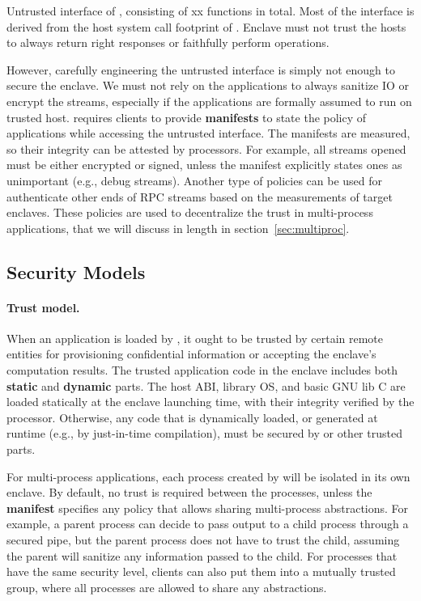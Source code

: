 \begin{table}
\centering

\caption{
Untrusted interface of \sysname{}, consisting of xx functions in total.
Most of the interface is derived from the host system call footprint of
\graphene{} \libos{}. Enclave must not trust the hosts to
always return right responses or faithfully perform operations.
}
\label{tab:interface}
\end{table}

However, carefully engineering the untrusted interface is simply not enough
to secure the enclave.
We must not rely on the applications to always
sanitize IO or encrypt the streams,
especially if the applications are formally assumed to run on trusted host.
\sysname{} requires clients to provide {\bf manifests} to state
the policy of applications while accessing the untrusted interface.
The manifests are measured, so their integrity can be attested by processors.
For example, all streams opened must be either encrypted or signed,
unless the manifest explicitly states ones as unimportant
(e.g., debug streams).
Another type of policies can be used for authenticate other ends of RPC streams
based on the measurements of target enclaves.
These policies are used to decentralize the trust in multi-process applications,
that we will discuss in length in section~\ref{sec:multiproc}.

\subsection{Security Models}
\label{sec:background:security}

\paragraph{Trust model.}
When an application is loaded by \sysname{}, it ought to be trusted by
certain remote entities
for provisioning confidential information or
accepting the enclave's computation results.
The trusted application code in the enclave includes both
{\bf static} and {\bf dynamic} parts.
The host ABI, library OS, and basic GNU lib C are loaded statically
at the enclave launching time,
with their integrity verified by the processor.
Otherwise, any code that is dynamically loaded, or generated at runtime
(e.g., by just-in-time compilation),
must be secured by \sysname{} or other trusted parts.

For multi-process applications, each process created by \sysname{}
will be isolated in its own enclave.
By default, no trust is required between the processes,
unless the {\bf manifest} specifies any policy
that allows sharing multi-process abstractions.
For example, a parent process can decide to pass output to a child process
through a secured pipe,
but the parent process does not have to trust the child, assuming
the parent will sanitize any information passed to the child.
For processes that have the same security level,
clients can also put them into a mutually trusted group,
where all processes are allowed to share any abstractions.

